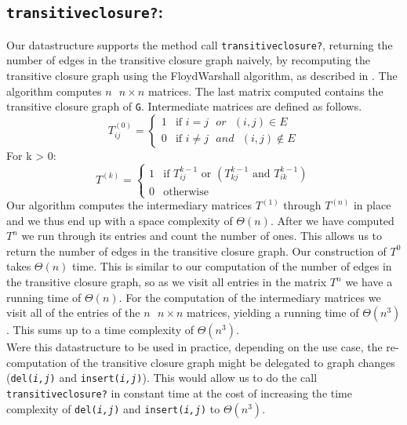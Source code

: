 \documentclass[a4paper,oneside,article]{memoir}
\begin{document}
\subsection{\texttt{transitiveclosure?}:}
Our datastructure supports the method call
\texttt{transitiveclosure?}, returning the number of edges in the
transitive closure graph naively, by recomputing the transitive closure
graph using the FloydWarshall algorithm, as described in \cite{IntAlg}.
The algorithm computes $n\text{ } n \times n$ matrices. The last
matrix computed contains the transitive closure graph of \texttt{G}. Intermediate matrices are defined as follows.
$$T^{(0)}_{ij} =
\begin{cases}
  1 & \text{if } i = j\text{ } or\text{ } (i,j) \in E \\
  0 & \text{if } i \neq j\text{ } and \text{ } (i,j) \notin E
\end{cases}
$$
For k > 0:
$$T^{(k)} =
\begin{cases}
  1 & \text{if } T^{k-1}_{ij} \text{ or } ( T^{k-1}_{kj} \text{ and } T^{k-1}_{ik} ) \\
  0 & \text{otherwise}
\end{cases}
$$ Our algorithm computes the intermediary matrices $T^{(1)}$ through
$T^{(n)}$ in place and we thus end up with a space complexity of
$\Theta(n)$.  After we have computed $T^{n}$ we run through its
entries and count the number of ones.  This allows us to return the
number of edges in the transitive closure graph.  Our construction of
$T^{0}$ takes $\Theta(n)$ time.  This is similar to our computation of
the number of edges in the transitive closure graph, so as we visit all
entries in the matrix $T^{n}$ we have a running time of $\Theta(n)$.
For the computation of the intermediary matrices we visit all of the
entries of the $n\text{ } n \times n$ matrices, yielding a running time
of $\Theta(n^3)$. This sums up to a time complexity of
$\Theta(n^3)$.\\ Were this datastructure to be used in practice,
depending on the use case, the re-computation of the transitive closure
graph might be delegated to graph changes (\texttt{del(\textit{i,j})}
and \texttt{insert(\textit{i,j})}). This would allow us to do the call
\texttt{transitiveclosure?} in constant time at the cost of increasing
the time complexity of \texttt{del(\textit{i,j})} and
\texttt{insert(\textit{i,j})} to $\Theta(n^3)$.
\end{document}
